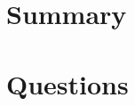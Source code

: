 \documentclass[11pt, aspectratio=169]{beamer}
\begin{document}
\section{Summary}

\section{Questions}
\end{document}
